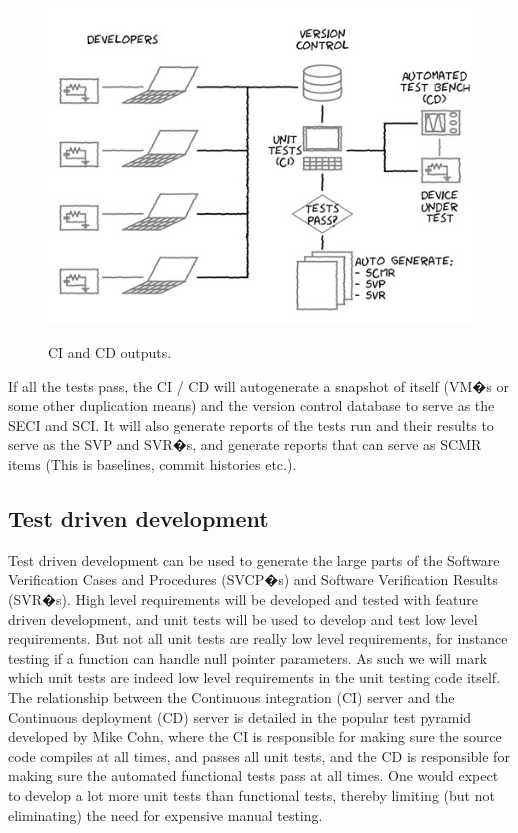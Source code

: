 \documentclass[a4paper]{article}
\begin{document}
\begin{figure}
\centering
\includegraphics[width=1\linewidth]{./pictures/CI-CD.jpg}\\
\caption{\label{fig:Output}CI and CD outputs.}
\end{figure}


If all the tests pass, the CI / CD will autogenerate a snapshot of itself (VM�s or some other duplication means) and the version control database to serve as the SECI and SCI. It will also generate reports of the tests run and their results to serve as the SVP and SVR�s, and generate reports that can serve as SCMR items (This is baselines, commit histories etc.).
\newpage


\subsection{Test driven development}
Test driven development can be used to generate the large parts of the Software Verification Cases and Procedures (SVCP�s) and Software Verification Results (SVR�s). High level requirements will be developed and tested with feature driven development, and unit tests will be used to develop and test low level requirements. But not all unit tests are really low level requirements, for instance testing if a function can handle null pointer parameters. As such we will mark which unit tests are indeed low level requirements in the unit testing code itself.\\ 
The relationship between the Continuous integration (CI) server and the Continuous deployment (CD) server is detailed in the popular test pyramid developed by Mike Cohn, where the CI is responsible for making sure the source code compiles at all times, and passes all unit tests, and the CD is responsible for making sure the automated functional tests pass at all times. One would expect to develop a lot more unit tests than functional tests, thereby limiting (but not eliminating) the need for expensive manual testing.\\
\newpage
\end{document}
